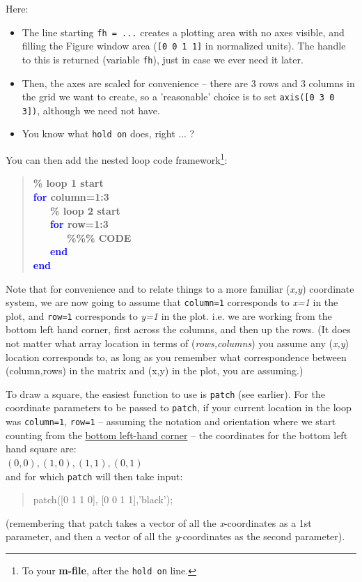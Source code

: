 \documentclass{tufte-book} %
\newenvironment{docspec}{\begin{quotation}\ttfamily\parskip0pt\parindent0pt\ignorespaces}{\end{quotation}}
\newenvironment{docspecbold}{\begin{quotation}\ttfamily\bfseries\parskip0pt\parindent0pt\ignorespaces}{\end{quotation}}
\begin{document}
\noindent Here:
\begin{itemize}[noitemsep]
\item The line starting \texttt{fh = ...} creates a plotting area with no axes visible, and filling the Figure window area (\texttt{[0 0 1 1]} in normalized units). The handle to this is returned (variable \texttt{fh}), just in case we ever need it later.
\item Then, the axes are scaled for convenience -- there are 3 rows and 3 columns in the grid we want to create, so a 'reasonable' choice is to set \texttt{axis([0 3 0 3])}, although we need not have.
\item You know what \texttt{hold on} does, right ... ?
\end{itemize}

You can then add the nested loop code framework\footnote{To your \textbf{m-file}, after the \texttt{hold on} line.}:
\begin{docspecbold}
\textcolor[rgb]{0,0.501961,0}{\% loop 1 start\\}
\textcolor{blue}{for} column=1:3\\
\ \ \ \textcolor[rgb]{0,0.501961,0}{\% loop 2 start\\}
\ \ \ \textcolor{blue}{for} row=1:3\\
\ \ \ \ \ \ \textcolor[rgb]{0,0.501961,0}{\%\%\% CODE}\\
\ \ \ \textcolor{blue}{end}\\
\textcolor{blue}{end}
\end{docspecbold}
Note that for convenience and to relate things to a more familiar (\textit{x,y}) coordinate system, we are now going to assume that \texttt{column=1} corresponds to \textit{x=1} in the plot, and \texttt{row=1} corresponds to \textit{y=1} in the plot. i.e. we are working from the bottom left hand corner, first across the columns, and then up the rows. (It does not matter what array location in terms of (\textit{rows,columns}) you assume any (\textit{x,y}) location corresponds to, as long as you remember what correspondence between (column,rows) in the matrix and (x,y) in the plot, you are assuming.)

To draw a square, the easiest function to use is \texttt{patch} (see earlier). For the coordinate parameters to be passed to \texttt{patch}, if your current location in the loop was \texttt{column=1}, \texttt{row=1} -- assuming the notation and orientation where we start counting from the \uline{bottom left-hand corner} --  the coordinates for the bottom left hand square are:
\vspace{1mm}
\\\((0,0), (1,0), (1,1), (0,1)\)
\vspace{1mm}
\\\noindent and for which \texttt{patch} will then take input:
\begin{docspec}
patch([0 1 1 0], [0 0 1 1],'black');
\end{docspec}
(remembering that patch takes a vector of all the \textit{x}-coordinates as a 1st parameter, and then a vector of all the \textit{y}-coordinates as the second parameter).
\end{document}
